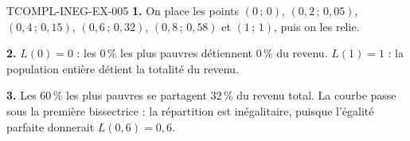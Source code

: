 \begin{corrige}{TCOMPL-INEG-EX-005}
\textbf{1.} On place les points $(0\,;\,0)$, $(0{,}2\,;\,0{,}05)$,
$(0{,}4\,;\,0{,}15)$, $(0{,}6\,;\,0{,}32)$, $(0{,}8\,;\,0{,}58)$ et
$(1\,;\,1)$, puis on les relie.

\textbf{2.} $L(0)=0$ : les $0\,\%$ les plus pauvres détiennent $0\,\%$ du
revenu. $L(1)=1$ : la population entière détient la totalité du revenu.

\textbf{3.} Les $60\,\%$ les plus pauvres se partagent $32\,\%$ du revenu
total. La courbe passe sous la première bissectrice : la répartition est
inégalitaire, puisque l'égalité parfaite donnerait $L(0{,}6)=0{,}6$.
\end{corrige}

